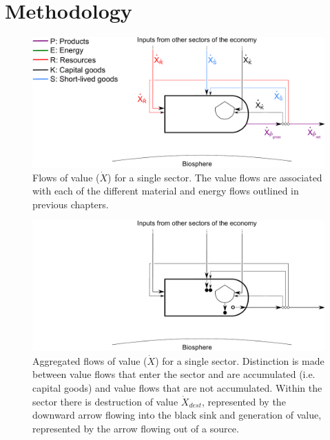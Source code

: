 \section{Methodology}
\label{sec:Value_Methodology}

\begin{figure}[h!]
\centering
\includegraphics[width=0.8\linewidth]{Part_3/Chapter_Values/images/PERKS_basic_unit_value_all.pdf}
\caption[Flows of value ($\dot{X}$) for a single sector]{Flows of value ($\dot{X}$) for a single sector. The value flows are associated with each of the different material and energy flows outlined in previous chapters.}
\label{fig:basic_value} 
\end{figure}

\begin{figure}[h!]
\centering
\includegraphics[width=0.8\linewidth]{Part_3/Chapter_Values/images/PERKS_basic_unit_value.pdf}
\caption[Aggregated flows of value ($\dot{X}$) for a single sector]{Aggregated flows of value ($\dot{X}$) for a single sector. Distinction is made between value flows that enter the sector and are accumulated (i.e. capital goods) and value flows that are not accumulated. Within the sector there is destruction of value $\dot{X}_{dest}$, represented by the downward arrow flowing into the black sink and generation of value, represented by the arrow flowing out of a source. }
\label{fig:basic_value} 
\end{figure}

